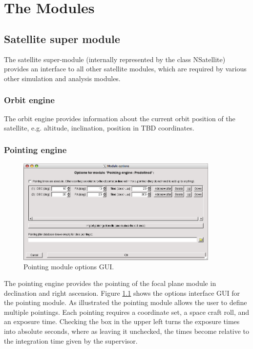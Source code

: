 \chapter{The Modules}

\section{Satellite super module}
The satellite super-module (internally represented by the class NSatellite) provides an interface to all other satellite modules, which are required by various other simulation and analysis modules.
\subsection{Orbit engine}
The orbit engine provides information about the current orbit position of the satellite, e.g. altitude, inclination, position in TBD coordinates.

\subsection{Pointing engine}
\begin{figure}[tb]
\begin{center}
\includegraphics[width=10cm]{images/pointingGUI.png}  
\caption{Pointing module options GUI.}
\label{pointinggui} 
\end{center}
\end{figure}
The pointing engine provides the pointing of the focal plane module in declination and right ascension. Figure \ref{pointinggui} shows the options interface GUI for the pointing module. As illustrated the pointing module allows the user to define multiple pointings. Each pointing requires a coordinate set, a space craft roll, and an exposure time. Checking the box in the upper left turns the exposure times into absolute seconds, where as leaving it unchecked, the times become relative to the integration time given by the supervisor.

